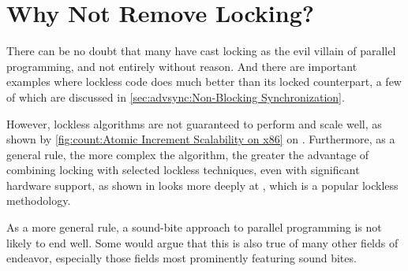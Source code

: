 
\section{Why Not Remove Locking?}
\label{sec:app:questions:Why Not Remove Locking?}

There can be no doubt that many have cast locking as the evil villain
of parallel programming, and not entirely without reason.
And there are important examples where lockless code does much better
than its locked counterpart, a few of which are discussed in
\cref{sec:advsync:Non-Blocking Synchronization}.

However, lockless algorithms are not guaranteed to perform and scale
well, as shown by
\cref{fig:count:Atomic Increment Scalability on x86} on
.
Furthermore, as a general rule, the more complex the algorithm,
the greater the advantage of combining locking with selected
lockless techniques, even with significant hardware support,
as shown in
looks more deeply at , which is a popular
lockless methodology.

As a more general rule, a sound-bite approach to parallel programming
is not likely to end well.
Some would argue that this is also true of many other fields of endeavor,
especially those fields most prominently featuring sound bites.
